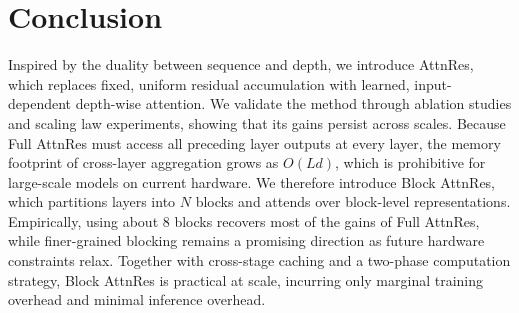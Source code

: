 \section*{Conclusion}

Inspired by the duality between sequence and depth, we introduce AttnRes, which replaces fixed, uniform residual accumulation with learned, input-dependent depth-wise attention. We validate the method through ablation studies and scaling law experiments, showing that its gains persist across scales. Because Full AttnRes must access all preceding layer outputs at every layer, the memory footprint of cross-layer aggregation grows as $O(Ld)$, which is prohibitive for large-scale models on current hardware. We therefore introduce Block AttnRes, which partitions layers into $N$ blocks and attends over block-level representations. Empirically, using about 8 blocks recovers most of the gains of Full AttnRes, while finer-grained blocking remains a promising direction as future hardware constraints relax. Together with cross-stage caching and a two-phase computation strategy, Block AttnRes is practical at scale, incurring only marginal training overhead and minimal inference overhead.
